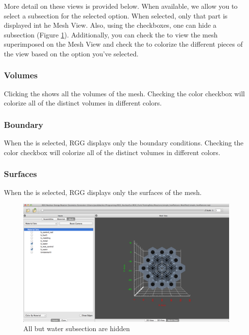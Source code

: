 More detail on these views is provided below.  When available, we allow you to select a subsection for the selected option.  When selected, only that part is displayed int he Mesh View.  Also, using the checkboxes, one can hide a subsection (Figure \ref{fig:subsectionMesh}).  Additionally, you can check the  to view the mesh superimposed on the Mesh View and check the  to colorize the different pieces of the view based on the option you've selected.

\subsubsection{Volumes}
Clicking the  shows all the volumes of the mesh.  Checking the color checkbox will colorize all of the distinct volumes in different colors.

\subsubsection{Boundary}
When the  is selected, RGG displays only the boundary conditions.  Checking the color checkbox will colorize all of the distinct volumes in different colors.

\subsubsection{Surfaces}
When the  is selected, RGG displays only the surfaces of the mesh.

\begin{figure}
	\begin{center}
		\includegraphics[width=0.95\linewidth]{Images/mesh-selection.png}
		\caption{All but water subsection are hidden}
		\label{fig:subsectionMesh}
	\end{center}
	\vspace{-5.cm}
\end{figure}

